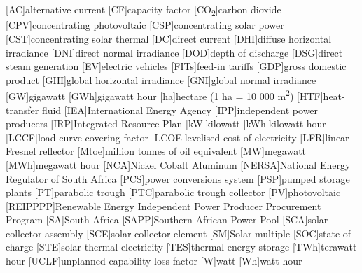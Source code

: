 {}
\chapter*{\listacroname}
\begin{acronym}[XXXXX]
  	[AC]{alternative current}
  	[CF]{capacity factor}
  	[CO\textsubscript{2}]{carbon dioxide}
    [CPV]{concentrating photovoltaic}
    [CSP]{concentrating solar power}
    [CST]{concentrating solar thermal} 
    [DC]{direct current}
    [DHI]{diffuse horizontal irradiance}
    [DNI]{direct normal irradiance}
	[DOD]{depth of discharge}
    [DSG]{direct steam generation}
    [EV]{electric vehicles}
    [FITs]{feed-in tariffs} 
    [GDP]{gross domestic product}
    [GHI]{global horizontal irradiance}
    [GNI]{global normal irradiance}
    [GW]{gigawatt}
    [GWh]{gigawatt hour} 
    [ha]{hectare (1 ha = 10 000 m\textsuperscript{2})} 
    [HTF]{heat-transfer fluid} 
    [IEA]{International Energy Agency}
    [IPP]{independent power producers}
    [IRP]{Integrated Resource Plan}
    [kW]{kilowatt}
    [kWh]{kilowatt hour}
    [LCCF]{load curve covering factor}
    [LCOE]{levelised cost of electricity}
    [LFR]{linear Fresnel reflector}
    [Mtoe]{million tonnes of oil equivalent}
    [MW]{megawatt}
    [MWh]{megawatt hour}
    [NCA]{Nickel Cobalt Aluminum}
    [NERSA]{National Energy Regulator of South Africa}
    [PCS]{power conversions system}
    [PSP]{pumped storage plants}
    [PT]{parabolic trough}
    [PTC]{parabolic trough collector}
    [PV]{photovoltaic}
    [REIPPPP]{Renewable Energy Independent Power Producer Procurement Program}
    [SA]{South Africa}
    [SAPP]{Southern African Power Pool}
    [SCA]{solar collector assembly}
    [SCE]{solar collector element}
    [SM]{Solar multiple}
    [SOC]{state of charge}
    [STE]{solar thermal electricity}
    [TES]{thermal energy storage}
    [TWh]{terawatt hour}
    [UCLF]{unplanned capability loss factor}
    [W]{watt}
    [Wh]{watt hour}
\end{acronym}
